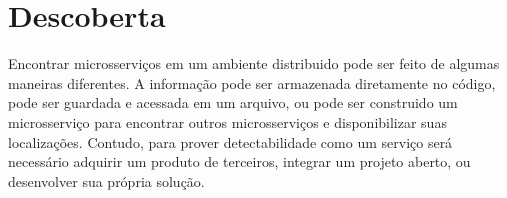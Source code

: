 \section{Descoberta}

Encontrar microsserviços em um ambiente distribuido pode ser feito de algumas maneiras diferentes. A informação pode ser armazenada diretamente no código, pode ser guardada e acessada em um arquivo, ou pode ser construido um microsserviço para encontrar outros microsserviços e disponibilizar suas localizações. Contudo, para prover detectabilidade como um serviço será necessário adquirir um produto de terceiros, integrar um projeto aberto, ou desenvolver sua própria solução.
